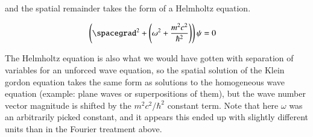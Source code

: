 \documentclass{article}
\begin{document}
and the spatial remainder takes the form of a Helmholtz equation.

\begin{align*}
\left( \spacegrad^2 + \left( \omega^2 + \frac{m^2 c^2}{\hbar^2} \right) \right) \psi &= 0
\end{align*}

The Helmholtz equation is also what we would have gotten with separation of variables for an unforced wave
equation, so the spatial solution of the Klein gordon equation takes the same form as solutions to the 
homogeneous wave equation (example: plane waves or superpositions of them), but the wave number vector
magnitude is shifted by the $m^2 c^2/\hbar^2$ constant term.  Note that here $\omega$ was an arbitrarily picked constant, and it appears this ended up with slightly different units than in the Fourier treatment above.





\end{document}
